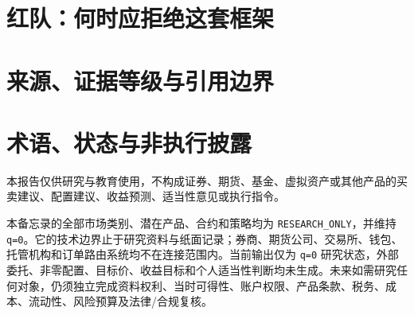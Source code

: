 \documentclass[a4paper,11pt,openany,fontset=none]{ctexrep}
\newcommand{\reportdisclaimer}{本报告仅供研究与教育使用，不构成证券、期货、基金、虚拟资产或其他产品的买卖建议、配置建议、收益预测、适当性意见或执行指令。}
\newcommand{\qzero}{\texttt{q=0}}
\newcommand{\researchonly}{\texttt{RESEARCH\_ONLY}}
\begin{document}
\chapter{红队：何时应拒绝这套框架}


\appendix
\chapter{来源、证据等级与引用边界}


\chapter{术语、状态与非执行披露}


\clearpage
\thispagestyle{empty}
\vspace*{4cm}
\begin{disclosurebox}[重要披露]
\small
\reportdisclaimer\par
本备忘录的全部市场类别、潜在产品、合约和策略均为 \researchonly{}，并维持 \qzero{}。它的技术边界止于研究资料与纸面记录；券商、期货公司、交易所、钱包、托管机构和订单路由系统均不在连接范围内。当前输出仅为 \qzero{} 研究状态，外部委托、非零配置、目标价、收益目标和个人适当性判断均未生成。未来如需研究任何对象，仍须独立完成资料权利、当时可得性、账户权限、产品条款、税务、成本、流动性、风险预算及法律/合规复核。
\end{disclosurebox}
\end{document}

